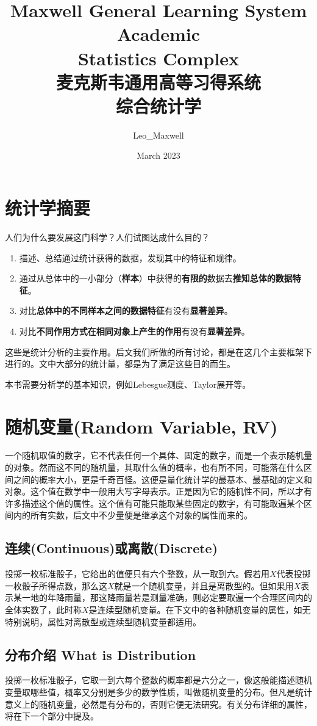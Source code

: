 \documentclass[UTF8]{ctexbook}
\title{Maxwell General Learning System Academic\\ Statistics Complex\\ 麦克斯韦通用高等习得系统\\ 综合统计学}
\author{Leo\_Maxwell }
\date{March 2023}
\begin{document}
\maketitle

\tableofcontents
\newpage

\chapter*{统计学摘要}
人们为什么要发展这门科学？人们试图达成什么目的？
\begin{enumerate}
	\item 描述、总结通过统计获得的数据，发现其中的特征和规律。
	\item 通过从总体中的一小部分（\textbf{样本}）中获得的\textbf{有限的}数据去\textbf{推知总体的数据特征}。
	\item 对比\textbf{总体中的不同样本之间的数据特征}有没有\textbf{显著差异}。
	\item 对比\textbf{不同作用方式在相同对象上产生的作用}有没有\textbf{显著差异}。
\end{enumerate}

这些是统计分析的主要作用。后文我们所做的所有讨论，都是在这几个主要框架下进行的。文中大部分的统计量，都是为了满足这些目的而生。

本书需要分析学的基本知识，例如Lebesgue测度、Taylor展开等。
\chapter{随机变量(Random Variable, RV)}
一个随机取值的数字，它不代表任何一个具体、固定的数字，而是一个表示随机量的对象。然而这不同的随机量，其取什么值的概率，也有所不同，可能落在什么区间之间的概率大小，更是千奇百怪。这便是量化统计学的最基本、最基础的定义和对象。这个值在数学中一般用大写字母表示。正是因为它的随机性不同，所以才有许多描述这个值的属性。这个值有可能只能取某些固定的数字，有可能取遍某个区间内的所有实数，后文中不少量便是继承这个对象的属性而来的。
\section{连续(Continuous)或离散(Discrete)}
投掷一枚标准骰子，它给出的值便只有六个整数，从一取到六。假若用$X$代表投掷一枚骰子所得点数，那么这$X$就是一个随机变量，并且是离散型的。但如果用$X$表示某一地的年降雨量，那这降雨量若是测量准确，则必定要取遍一个合理区间内的全体实数了，此时称$X$是连续型随机变量。在下文中的各种随机变量的属性，如无特别说明，属性对离散型或连续型随机变量都适用。
\section{分布介绍 What is Distribution}
投掷一枚标准骰子，它取一到六每个整数的概率都是六分之一，像这般能描述随机变量取哪些值，概率又分别是多少的数学性质，叫做随机变量的分布。但凡是统计意义上的随机变量，必然是有分布的，否则它便无法研究。有关分布详细的属性，将在下一个部分中提及。
\end{document}
